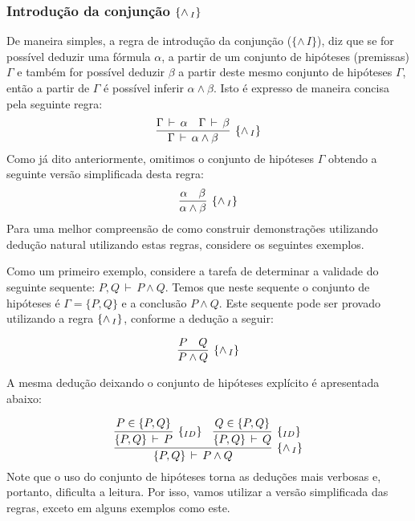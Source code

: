 \subsubsection{Introdu\c{c}\~ao da conjun\c{c}\~ao $\scriptsize{\{\land\,_I\}}$}

De maneira simples, a regra de introdu\c{c}\~ao da conjun\c{c}\~ao
($\{\land\,I\}$), diz que se for poss\'ivel deduzir uma f\'ormula $\alpha$, a
partir de um conjunto de hip\'oteses (premissas) $\Gamma$ e tamb\'em
for poss\'ivel deduzir $\beta$ a partir deste mesmo conjunto de
hip\'oteses $\Gamma$, ent\~ao a partir de $\Gamma$ \'e poss\'ivel
inferir $\alpha\land \beta$.  Isto \'e expresso de maneira concisa pela
seguinte regra:
\[
    \infer[\andI]
             {\Gamma\,\vdash\,\alpha \land \beta}
             {\Gamma\,\vdash\,\alpha & \Gamma\,\vdash\, \beta}
\]
Como j\'a dito anteriormente, omitimos o conjunto de hip\'oteses $\Gamma$ obtendo a
seguinte vers\~ao simplificada desta regra:
\[
    \infer[\andI]
             {\alpha \land \beta}
             {\alpha & \beta}
\]
Para uma melhor compreens\~ao de como construir demonstra\c{c}\~oes
utilizando dedu\c{c}\~ao natural utilizando estas regras, considere os
seguintes exemplos.

\begin{Example}
    Como um primeiro exemplo, considere a tarefa de determinar a
    validade do seguinte sequente: $P, Q \,\vdash\, P \land Q$. Temos
    que neste sequente o conjunto de hip\'oteses \'e
    $\Gamma=\{P,Q\}$ e a conclus\~ao $P\land Q$. Este sequente pode
    ser provado utilizando a regra $\scriptsize{\{\land\,_I\}}$, conforme a dedu\c{c}\~ao a seguir:

    \[
         \infer[\andI]
                  {P \land Q}
                  {P & Q}
    \]

    A mesma dedu\c{c}\~ao deixando o conjunto de hip\'oteses
    expl\'icito \'e apresentada abaixo:

    \[
         \infer[\andI]
                  {\{P,Q\}\,\vdash\,P \land Q}
                  {
                    \infer[\Id]
                             {\{P,Q\} \,\vdash\,P}
                             {P \in \{P,Q\}}
                    &
                    \infer[\Id]
                             {\{P,Q\} \,\vdash\,Q}
                             {Q \in \{P,Q\}}
                  }
    \]
    Note que o uso do conjunto de hip\'oteses torna as dedu\c{c}\~oes
    mais verbosas e, portanto, dificulta a leitura. Por isso, vamos
    utilizar a vers\~ao simplificada das regras, exceto em alguns
    exemplos como este.
\end{Example}

